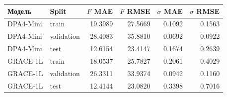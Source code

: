 \begin{center}
\small
\begin{tabular}{llrrrr}
\toprule
Модель & Split & $F$ MAE & $F$ RMSE & $\sigma$ MAE & $\sigma$ RMSE\\
\midrule
DPA4-Mini & train & 19.3989 & 27.5669 & 0.1092 & 0.1563\\
DPA4-Mini & validation & 28.4083 & 35.8810 & 0.0692 & 0.0922\\
DPA4-Mini & test & 12.6154 & 23.4147 & 0.1674 & 0.2639\\
\midrule
GRACE-1L & train & 18.0537 & 25.7827 & 0.2061 & 0.4029\\
GRACE-1L & validation & 26.3311 & 33.9374 & 0.0942 & 0.1160\\
GRACE-1L & test & 12.4144 & 23.0820 & 0.3398 & 0.7016\\
\bottomrule
\end{tabular}
\end{center}
